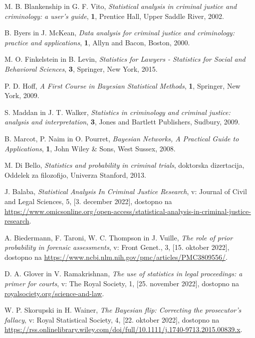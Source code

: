 \documentclass[mat1, tisk]{fmfdelo}
\theoremstyle{definition} %
\theoremstyle{trditev} %
\theoremstyle{izrek}
\begin{document}
\begin{thebibliography}{99}
        M. B. Blankenship in G. F. Vito, \emph{Statistical analysis in criminal justice and criminology: a user's guide}, \textbf{1}, Prentice Hall, Upper Saddle River, 2002.

        B. Byers in J. McKean, \emph{Data analysis for criminal justice and criminology: practice and applications}, \textbf{1}, Allyn and Bacon, Boston, 2000.

        M. O. Finkelstein in B. Levin, \emph{Statistics for Lawyers - Statistics for Social and Behavioral Sciences}, \textbf{3}, Springer, New York, 2015.

        P. D. Hoff, \emph{A First Course in Bayesian Statistical Methods}, \textbf{1}, Springer, New York, 2009.

        S. Maddan in J. T. Walker, \emph{Statistics in criminology and criminal justice: analysis and interpretation}, \textbf{3}, Jones and Bartlett Publishers, Sudbury, 2009.

        B. Marcot, P. Naim in O. Pourret, \emph{Bayesian Networks, A Practical Guide to Applications}, \textbf{1}, John Wiley \& Sons, West Sussex, 2008.

        M. Di Bello, \emph{Statistics and probability in criminal trials}, doktorska dizertacija, Oddelek za filozofijo, Univerza Stanford, 2013.

        J. Balaba, \emph{Statistical Analysis In Criminal Justice Research}, v: Journal of Civil and Legal Sciences, 5, [3. december 2022], dostopno na \url{https://www.omicsonline.org/open-access/statistical-analysis-in-criminal-justice-research}.

        A. Biedermann, F. Taroni, W. C. Thompson in J. Vuille, \emph{The role of prior probability in forensic assessments}, v: Front Genet., 3, [15. oktober 2022], dostopno na \url{https://www.ncbi.nlm.nih.gov/pmc/articles/PMC3809556/}.

        D. A. Glover in V. Ramakrishnan, \emph{The use of statistics in legal proceedings: a primer for courts}, v: The Royal Society, 1, [25. november 2022], dostopno na \url{royalsociety.org/science-and-law}.

        W. P. Skorupski in H. Wainer, \emph{The Bayesian flip: Correcting the prosecutor's fallacy}, v: Royal Statistical Society, 4, [22. oktober 2022], dostopno na \url{https://rss.onlinelibrary.wiley.com/doi/full/10.1111/j.1740-9713.2015.00839.x}.

\end{thebibliography}
\end{document}
